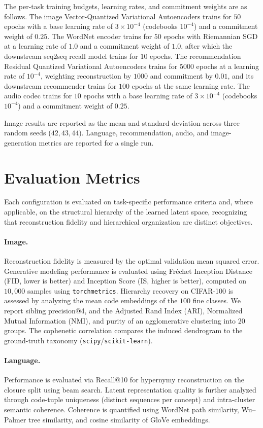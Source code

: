 \documentclass[12pt]{report}
\begin{document}
The per-task training budgets, learning rates, and commitment weights are as follows. The image Vector-Quantized Variational Autoencoders trains for $50$ epochs with a base learning rate of $3\times10^{-4}$ (codebooks $10^{-4}$) and a commitment weight of $0.25$. The WordNet encoder trains for $50$ epochs with Riemannian SGD at a learning rate of $1.0$ and a commitment weight of $1.0$, after which the downstream seq2seq recall model trains for $10$ epochs. The recommendation Residual Quantized Variational Autoencoders trains for $5000$ epochs at a learning rate of $10^{-4}$, weighting reconstruction by $1000$ and commitment by $0.01$, and its downstream recommender trains for $100$ epochs at the same learning rate. The audio codec trains for $10$ epochs with a base learning rate of $3\times10^{-4}$ (codebooks $10^{-4}$) and a commitment weight of $0.25$.

Image results are reported as the mean and standard deviation across three random seeds ($42, 43, 44$). Language, recommendation, audio, and image-generation metrics are reported for a single run.

\section{Evaluation Metrics}
\label{sec:metrics}

Each configuration is evaluated on task-specific performance criteria and, where applicable, on the structural hierarchy of the learned latent space, recognizing that reconstruction fidelity and hierarchical organization are distinct objectives.

\paragraph{Image.} Reconstruction fidelity is measured by the optimal validation mean squared error. Generative modeling performance is evaluated using Fr\'echet Inception Distance (FID, lower is better) and Inception Score (IS, higher is better), computed on $10{,}000$ samples using \texttt{torchmetrics}. Hierarchy recovery on CIFAR-100 is assessed by analyzing the mean code embeddings of the $100$ fine classes. We report sibling precision@4, and the Adjusted Rand Index (ARI), Normalized Mutual Information (NMI), and purity of an agglomerative clustering into $20$ groups. The cophenetic correlation compares the induced dendrogram to the ground-truth taxonomy (\texttt{scipy}/\texttt{scikit-learn}).

\paragraph{Language.} Performance is evaluated via Recall@10 for hypernymy reconstruction on the closure split using beam search. Latent representation quality is further analyzed through code-tuple uniqueness (distinct sequences per concept) and intra-cluster semantic coherence. Coherence is quantified using WordNet path similarity, Wu--Palmer tree similarity, and cosine similarity of GloVe embeddings.
\end{document}
